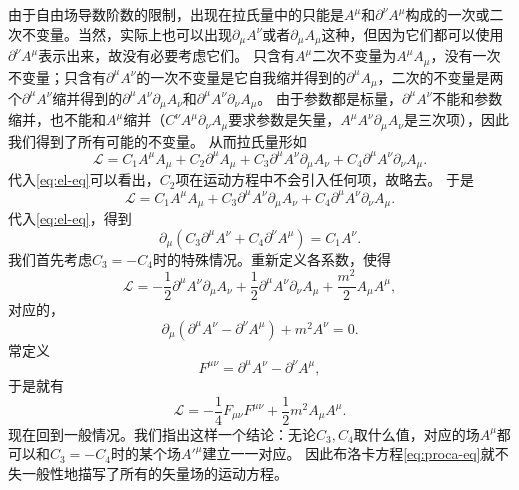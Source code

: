 \documentclass[hyperref, UTF8, a4paper]{ctexart}
\begin{document}
由于自由场导数阶数的限制，出现在拉氏量中的只能是$A^\mu$和$\partial^\nu A^\mu$构成的一次或二次不变量。当然，实际上也可以出现$\partial_\mu A^\nu$或者$\partial_\mu A_\mu$这种，但因为它们都可以使用$\partial^\nu A^\mu$表示出来，故没有必要考虑它们。
只含有$A^\mu$二次不变量为$A^\mu A_\mu$，没有一次不变量；只含有$\partial^\mu A^\nu$的一次不变量是它自我缩并得到的$\partial^\mu A_\mu$，二次的不变量是两个$\partial^\mu A^\nu$缩并得到的$\partial^\mu A^\nu \partial_\mu A_\nu$和$\partial^\mu A^\nu \partial_\nu A_\mu$。
由于参数都是标量，$\partial^\mu A^\nu$不能和参数缩并，也不能和$A^\mu$缩并（$C^\nu A^\mu \partial_\nu A_\mu$要求参数是矢量，$A^\mu A^\nu \partial_\mu A_\nu$是三次项），因此我们得到了所有可能的不变量。
从而拉氏量形如
\[
    \mathcal{L} = C_1 A^\mu A_\mu + C_2 \partial^\mu A_\mu + C_3 \partial^\mu A^\nu \partial_\mu A_\nu + C_4 \partial^\mu A^\nu \partial_\nu A_\mu.
\]
代入\eqref{eq:el-eq}可以看出，$C_2$项在运动方程中不会引入任何项，故略去。
于是
\[
    \mathcal{L} = C_1 A^\mu A_\mu + C_3 \partial^\mu A^\nu \partial_\mu A_\nu + C_4 \partial^\mu A^\nu \partial_\nu A_\mu.
\]
代入\eqref{eq:el-eq}，得到
\begin{equation}
    \partial_\mu (C_3 \partial^\mu A^\nu +  C_4 \partial^\nu A^\mu) = C_1 A^\nu.
    \label{eq:vector-motion-eq}
\end{equation}
我们首先考虑$C_3 = - C_4$时的特殊情况。重新定义各系数，使得
\begin{equation}
    \mathcal{L} = - \frac{1}{2} \partial^\mu A^\nu \partial_\mu A_\nu + \frac{1}{2} \partial^\mu A^\nu \partial_\nu A_\mu + \frac{m^2}{2} A_\mu A^\mu,
\end{equation}
对应的，
\begin{equation}
    \partial_\mu (\partial^\mu A^\nu - \partial^\nu A^\mu) + m^2 A^\nu = 0.
    \label{eq:proca-eq}
\end{equation}
常定义
\begin{equation}
    F^{\mu \nu} = \partial^\mu A^\nu - \partial^\nu A^\mu,
\end{equation}
于是就有
\begin{equation}
    \mathcal{L} = - \frac{1}{4} F_{\mu \nu} F^{\mu \nu} + \frac{1}{2} m^2 A_\mu A^\mu.
\end{equation}
现在回到一般情况。我们指出这样一个结论：无论$C_3,C_4$取什么值，对应的场$A^\mu$都可以和$C_3 = - C_4$时的某个场${A'}^\mu$建立一一对应。
因此布洛卡方程\eqref{eq:proca-eq}就不失一般性地描写了所有的矢量场的运动方程。
\end{document}
